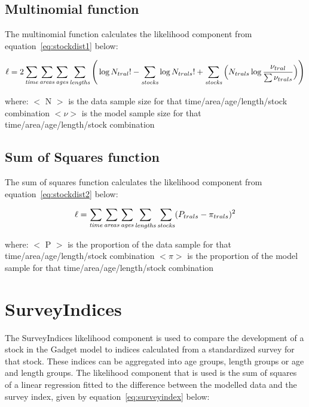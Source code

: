 \documentclass [a4paper, 10pt]{book}
\begin{document}
\subsection{Multinomial function}
The multinomial function calculates the likelihood component from equation~\ref{eq:stockdist1} below:

\begin{equation}\label{eq:stockdist1}
\ell = 2 \sum_{\it time}\sum_{\it areas}\sum_{\it ages}\sum_{\it lengths} \Bigg( \log N_{tral}! - \sum_{\it stocks} \log N_{trals}! + \sum_{\it stocks} \Big( N_{trals} \log {\frac{\nu_{tral}}{\sum \nu_{trals}}} \Big)\Bigg)
\end{equation}

where:\newline
$<$ N $>$ is the data sample size for that time/area/age/length/stock combination\newline
$<\nu>$ is the model sample size for that time/area/age/length/stock combination

\subsection{Sum of Squares function}
The sum of squares function calculates the likelihood component from equation~\ref{eq:stockdist2} below:

\begin{equation}\label{eq:stockdist2}
\ell = \sum_{\it time}\sum_{\it areas}\sum_{\it ages}\sum_{\it lengths}\sum_{\it stocks} ( P_{trals} - \pi_{trals} ) ^2
\end{equation}

where:\newline
$<$ P $>$ is the proportion of the data sample for that time/area/age/length/stock combination\newline
$<\pi>$ is the proportion of the model sample for that time/area/age/length/stock combination

\section{SurveyIndices}\label{sec:surveyindices}
The SurveyIndices likelihood component is used to compare the development of a stock in the Gadget model to indices calculated from a standardized survey for that stock.  These indices can be aggregated into age groups, length groups or age and length groups.  The likelihood component that is used is the sum of squares of a linear regression fitted to the difference between the modelled data and the survey index, given by  equation~\ref{eq:surveyindex} below:
\end{document}
